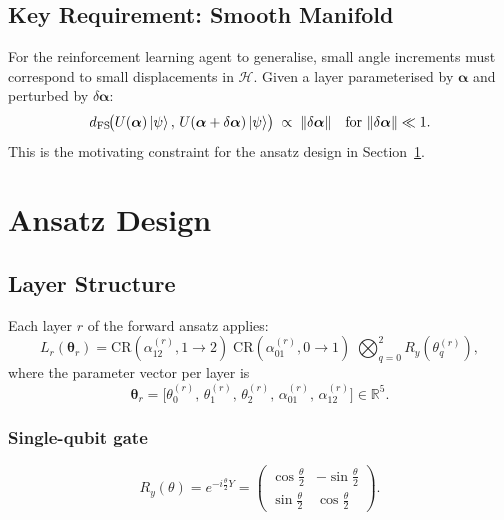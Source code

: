 \documentclass[11pt,a4paper]{article}
\begin{document}
\subsection{Key Requirement: Smooth Manifold}

For the reinforcement learning agent to generalise, small angle increments must correspond
to small displacements in $\mathcal{H}$. Given a layer parameterised by $\boldsymbol{\alpha}$
and perturbed by $\delta\boldsymbol{\alpha}$:
\begin{equation}
    d_{\mathrm{FS}}\!\bigl(U(\boldsymbol{\alpha})\ket{\psi},\,
    U(\boldsymbol{\alpha}+\delta\boldsymbol{\alpha})\ket{\psi}\bigr)
    \;\propto\; \|\delta\boldsymbol{\alpha}\|
    \quad\text{for }\|\delta\boldsymbol{\alpha}\| \ll 1.
\end{equation}
This is the motivating constraint for the ansatz design in Section~\ref{sec:ansatz}.

\section{Ansatz Design}\label{sec:ansatz}

\subsection{Layer Structure}

Each layer $r$ of the forward ansatz applies:
\begin{equation}
    L_r(\boldsymbol{\theta}_r) =
    \mathrm{CR}(\alpha_{12}^{(r)}, 1{\to}2)\;
    \mathrm{CR}(\alpha_{01}^{(r)}, 0{\to}1)\;
    \bigotimes_{q=0}^{2} R_y(\theta_q^{(r)}),
\end{equation}
where the parameter vector per layer is
\begin{equation}
    \boldsymbol{\theta}_r = \bigl[\theta_0^{(r)},\, \theta_1^{(r)},\, \theta_2^{(r)},\,
    \alpha_{01}^{(r)},\, \alpha_{12}^{(r)}\bigr] \in \mathbb{R}^5.
\end{equation}

\subsubsection*{Single-qubit gate}
\begin{equation}
    R_y(\theta) = e^{-i\frac{\theta}{2}Y} =
    \begin{pmatrix} \cos\frac{\theta}{2} & -\sin\frac{\theta}{2} \\
    \sin\frac{\theta}{2} & \cos\frac{\theta}{2} \end{pmatrix}.
\end{equation}
\end{document}
